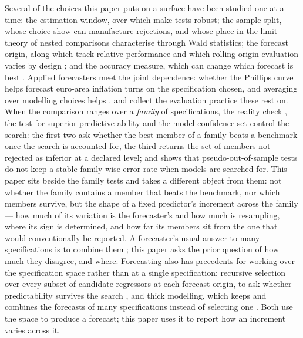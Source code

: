 \documentclass[11pt,3p,review,authoryear]{elsarticle}
\theoremstyle{definition}
\begin{document}
Several of the choices this paper puts on a surface have been studied one at
a time: the estimation window, over which \citet{rossi2012window} make tests
robust; the sample split, whose choice \citet{hansen2012sample} show can
manufacture rejections, and whose place in the limit theory of nested
comparisons \citet{hansen2015equivalence} characterise through Wald
statistics; the forecast origin, along which \citet{giacomini2010unstable}
track relative performance and which rolling-origin evaluation varies by
design \citep{tashman2000outofsample}; and the accuracy measure, which can
change which forecast is best \citep{hyndman2006another,kolassa2020best}.
Applied forecasters meet the joint dependence: whether the Phillips curve
helps forecast euro-area inflation turns on the specification chosen, and
averaging over modelling choices helps \citep{banbura2023phillips}.
\citet{petropoulos2022forecasting} and \citet{hewamalage2023forecast} collect
the evaluation practice these rest on. When the comparison ranges over a
\emph{family} of specifications, the reality check \citep{white2000reality},
the test for superior predictive ability \citep{hansen2005spa} and the model
confidence set \citep{hansen2011mcs} control the search: the first two ask
whether the best member of a family beats a benchmark once the search is
accounted for, the third returns the set of members not rejected as inferior
at a declared level; and \citet{hunt2022insample} shows that pseudo-out-of-sample
tests do not keep a stable family-wise error rate when models are searched
for. This paper sits beside the family tests and takes a different object
from them: not whether the family contains a member that beats the
benchmark, nor which members survive, but the shape of a fixed predictor's
increment across the family --- how much of its variation is the
forecaster's and how much is resampling, where its sign is determined, and
how far its members sit from the one that would conventionally be reported.
A forecaster's usual answer to many specifications is to combine them
\citep{wang2023combinations}; this paper asks the prior question of how much
they disagree, and where. Forecasting also has precedents for working over the
specification space rather than at a single specification: recursive selection over
every subset of candidate regressors at each forecast origin, to ask whether
predictability survives the search \citep{pesaran1995predictability}, and
thick modelling, which keeps and combines the forecasts of many
specifications instead of selecting one
\citep{granger2004thick,aiolfi2005model}. Both use the space to produce a
forecast; this paper uses it to report how an increment varies across it.
\end{document}
